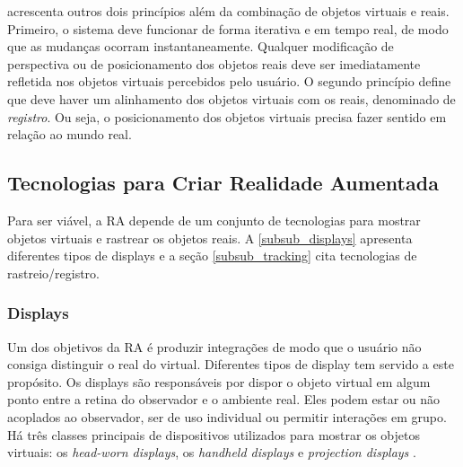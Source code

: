 
 acrescenta outros dois princípios além da combinação de objetos virtuais e reais. Primeiro, o sistema deve funcionar de forma iterativa e em tempo real, de modo que as mudanças ocorram instantaneamente. Qualquer modificação de perspectiva ou de posicionamento dos objetos reais deve ser imediatamente refletida nos objetos virtuais percebidos pelo usuário. O segundo princípio define que deve haver um alinhamento dos objetos virtuais com os reais, denominado de \textit{registro}. Ou seja, o posicionamento dos objetos virtuais precisa fazer sentido em relação ao mundo real.

\subsection{Tecnologias para Criar Realidade Aumentada}

Para ser viável, a RA depende de um conjunto de tecnologias para mostrar objetos virtuais e rastrear os objetos reais. A \autoref{subsub_displays} apresenta diferentes tipos de displays e a seção \autoref{subsub_tracking} cita tecnologias de rastreio/registro.

\subsubsection{Displays}
\label{subsub_displays}

Um dos objetivos da RA é produzir integrações de modo que o usuário não consiga distinguir o real do virtual. Diferentes tipos de display tem servido a este propósito. Os displays são responsáveis por dispor o objeto virtual em algum ponto entre a retina do observador e o ambiente real. Eles podem estar ou não acoplados ao observador, ser de uso individual ou permitir interações em grupo. Há três classes principais de dispositivos utilizados para mostrar os objetos virtuais: os \textit{head-worn displays}, os \textit{handheld displays} e \textit{projection displays} \cite{azuma_recent_2001}.

